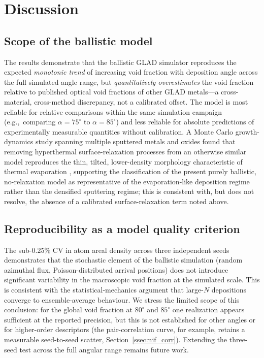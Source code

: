 \documentclass[aip,amsmath,amssymb,reprint]{revtex4-1}
\newcommand{\dang}{\ensuremath{\alpha}}
\begin{document}
\section{Discussion}
\label{sec:discussion}

\subsection{Scope of the ballistic model}
\label{ssec:scope}

The results demonstrate that the ballistic GLAD simulator
reproduces the expected \textit{monotonic trend} of increasing void
fraction with deposition angle across the full simulated angle range, but
\textit{quantitatively overestimates} the void fraction relative to
published optical void fractions of other GLAD metals---a cross-material,
cross-method discrepancy, not a calibrated offset.  The model is most reliable for relative
comparisons within the same simulation campaign (e.g.,\ comparing
$\dang = 75^{\circ}$ to $\dang = 85^{\circ}$) and less reliable for absolute
predictions of experimentally measurable quantities without calibration.
A Monte Carlo growth-dynamics study spanning multiple sputtered metals and
oxides found that removing hyperthermal surface-relaxation processes from
an otherwise similar model reproduces the thin, tilted, lower-density
morphology characteristic of thermal evaporation \citep{alvarez2024},
supporting the classification of the present purely ballistic, no-relaxation
model as representative of the evaporation-like deposition regime rather
than the densified sputtering regime; this is consistent with, but does not
resolve, the absence of a calibrated surface-relaxation term noted above.

\subsection{Reproducibility as a model quality criterion}
\label{ssec:repro}

The sub-$0.25\%$ CV in atom areal density across three independent
seeds demonstrates that the stochastic element of the ballistic
simulation (random azimuthal flux, Poisson-distributed arrival positions)
does not introduce significant variability in the macroscopic void
fraction at the simulated scale.  This is consistent with the
statistical-mechanics argument that large-$N$ depositions converge to
ensemble-average behaviour.  We stress the limited scope of this
conclusion: for the global void fraction at $80^{\circ}$ and $85^{\circ}$
one realization appears sufficient at the reported precision, but this is
not established for other angles or for higher-order descriptors (the
pair-correlation curve, for example, retains a measurable seed-to-seed
scatter, Section~\ref{ssec:nif_corr}).  Extending the three-seed test
across the full angular range remains future work.
\end{document}
